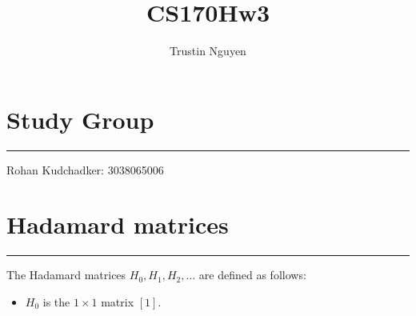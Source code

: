 \documentclass{article}
\title{CS170Hw3}
\author{Trustin Nguyen}
\begin{document}
    \maketitle

\reversemarginpar

\section*{Study Group}
\hrule
Rohan Kudchadker: 3038065006

\newpage
\section*{Hadamard matrices}
\hrule
The Hadamard matrices $H_{0}, H_{1}, H_{2}, \ldots$ are defined as follows:
    \begin{itemize}
        \item $H_{0}$ is the $1 \times 1$ matrix $[1]$.


\end{itemize}
\end{document}
